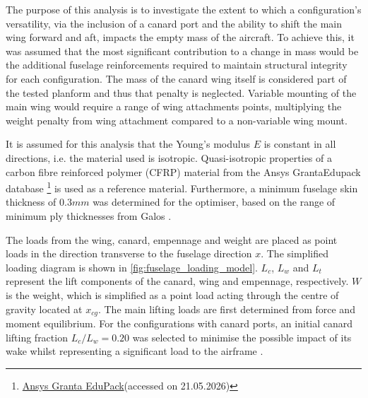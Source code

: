 
The purpose of this analysis is to investigate the extent to which a configuration's versatility, via the inclusion of a canard port and the ability to shift the main wing forward and aft, impacts the empty mass of the aircraft. To achieve this, it was assumed that the most significant contribution to a change in mass would be the additional fuselage reinforcements required to maintain structural integrity for each configuration. The mass of the canard wing itself is considered part of the tested planform and thus that penalty is neglected. Variable mounting of the main wing would require a range of wing attachments points, multiplying the weight penalty from wing attachment compared to a non-variable wing mount.  

It is assumed for this analysis that the Young's modulus $E$ is constant in all directions, i.e. the material used is isotropic. Quasi-isotropic properties of a carbon fibre reinforced polymer (CFRP) material from the Ansys GrantaEdupack database \footnote{\href{https://www.ansys.com/products/materials/granta-edupack}{Ansys Granta EduPack}(accessed on 21.05.2026)} is used as a reference material. Furthermore, a minimum fuselage skin thickness of $0.3mm$ was determined for the optimiser, based on the range of minimum ply thicknesses from Galos \cite{galos2020thin}.

The loads from the wing, canard, empennage and weight are placed as point loads in the direction transverse to the fuselage direction $x$. The simplified loading diagram is shown in \autoref{fig:fuselage_loading_model}. $L_c$, $L_w$ and $L_t$ represent the lift components of the canard, wing and empennage, respectively. $W$ is the weight, which is simplified as a point load acting through the centre of gravity located at $x_{cg}$. The main lifting loads are first determined from force and moment equilibrium. For the configurations with canard ports, an initial canard lifting fraction $L_c / L_w = 0.20$ was selected to minimise the possible impact of its wake whilst representing a significant load to the airframe \cite{AdvancedACDesign_Torenbeek}.

